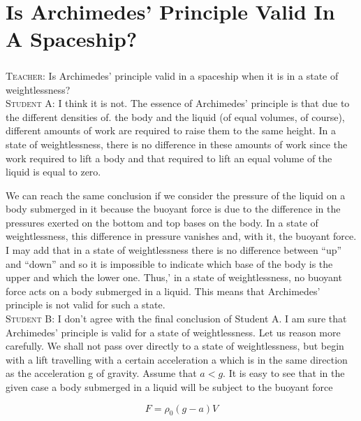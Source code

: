\documentclass[a4paper,sfsidenotes]{tufte-book}
\begin{document}
\chapter{Is Archimedes' Principle Valid In A Spaceship?}
\label{ch-17}

\paragraph{}

\textsc{Teacher:} Is Archimedes' principle valid in a spaceship when it is in a state of weightlessness?
\\
\textsc{Student A:} I think it is not. The essence of Archimedes' principle is that due to the different
densities of. the body and the liquid (of equal volumes, of course), different amounts of work
are required to raise them to the same height. In a state of weightlessness, there is no difference in
these amounts of work since the work required to lift a body and that required to lift an equal
volume of the liquid is equal to zero.

We can reach the same conclusion if we consider the pressure of the liquid on a body submerged in it because the buoyant force is due to the difference in the pressures exerted on the bottom and top bases on the body. In a state of weightlessness, this difference in pressure vanishes and, with it, the buoyant force. I may add that in a state of weightlessness there is no difference between ``up'' and ``down'' and so it is impossible to indicate which base of the body is the upper and which the lower one.
Thus,' in a state of weightlessness, no buoyant force acts on a body submerged in a liquid. This means that Archimedes' principle is not valid for such a state.
\\
\textsc{Student B:} I don't agree with the final conclusion of Student A. I am sure that Archimedes' principle is valid for a state of weightlessness. Let us reason more carefully. We shall not pass over directly to a state of weightlessness, but begin with a lift travelling with a certain acceleration
a which is in the same direction as the acceleration g of gravity. Assume that $a < g$. It is easy to see that in the given case a body submerged in a liquid will be subject to the buoyant force

\begin{equation}%
F= \rho_{0} (g-a)V
\label{eq-96}
\end{equation}
\end{document}
